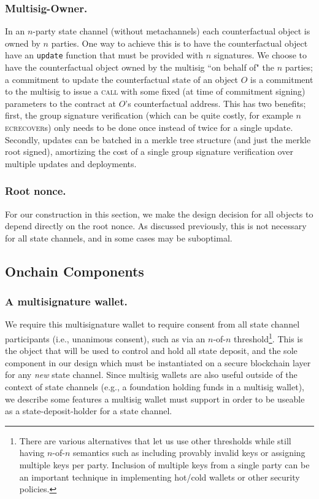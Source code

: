 \documentclass[prb,floatfix,reprint,nofootinbib,amsmath,amssymb,epsfig,pre,floats,letterpaper,groupedaffiliation,tightenlines,allcolors=blue,11pt]{revtex4}
\theoremstyle{definition}
\theoremstyle{definition}
\theoremstyle{definition}
\begin{document}
\subsubsection{Multisig-Owner.} In an $n$-party state channel (without metachannels) each counterfactual object is owned by $n$ parties. One way to achieve this is to have the counterfactual object have an \texttt{update} function that must be provided with $n$ signatures. We choose to have the counterfactual object owned by the multisig ``on behalf of" the $n$ parties; a commitment to update the counterfactual state of an object $O$ is a commitment to the multisig to issue a \textsc{call} with some fixed (at time of commitment signing) parameters to the contract at $O$'s counterfactual address. This has two benefits; first, the group signature verification (which can be quite costly, for example $n$ \textsc{ecrecover}s) only needs to be done once instead of twice for a single update. Secondly, updates can be batched in a merkle tree structure (and just the merkle root signed), amortizing the cost of a single group signature verification over multiple updates and deployments.

\subsubsection{Root nonce.} \label{sec:rootnonce} For our construction in this section, we make the design decision for all objects to depend directly on the root nonce. As discussed previously, this is not necessary for all state channels, and in some cases may be suboptimal.

\subsection{Onchain Components}

\subsubsection{A multisignature wallet.}

We require this multisignature wallet to require consent from all state channel participants (i.e., unanimous consent), such as via an $n$-of-$n$ threshold\footnote{There are various alternatives that let us use other thresholds while still having $n$-of-$n$ semantics such as including provably invalid keys or assigning multiple keys per party. Inclusion of multiple keys from a single party can be an important technique in implementing hot/cold wallets or other security policies.}. This is the object that will be used to control and hold all state deposit, and the sole component in our design which must be instantiated on a secure blockchain layer for any \textit{new} state channel. Since multisig wallets are also useful outside of the context of state channels (e.g., a foundation holding funds in a multisig wallet), we describe some features a multisig wallet must support in order to be useable as a state-deposit-holder for a state channel.
\end{document}
